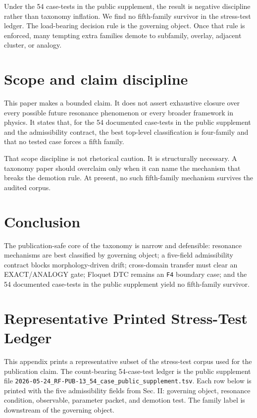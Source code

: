 \documentclass[aps,pra,reprint,nofootinbib]{revtex4-2}
\begin{document}
Under the 54 case-tests in the public supplement, the result is negative discipline rather than taxonomy inflation. We find no fifth-family survivor in the stress-test ledger. The load-bearing decision rule is the governing object. Once that rule is enforced, many tempting extra families demote to subfamily, overlay, adjacent cluster, or analogy.

\section{Scope and claim discipline}

This paper makes a bounded claim. It does not assert exhaustive closure over every possible future resonance phenomenon or every broader framework in physics. It states that, for the 54 documented case-tests in the public supplement and the admissibility contract, the best top-level classification is four-family and that no tested case forces a fifth family.

That scope discipline is not rhetorical caution. It is structurally necessary. A taxonomy paper should overclaim only when it can name the mechanism that breaks the demotion rule. At present, no such fifth-family mechanism survives the audited corpus.

\section{Conclusion}

The publication-safe core of the taxonomy is narrow and defensible: resonance mechanisms are best classified by governing object; a five-field admissibility contract blocks morphology-driven drift; cross-domain transfer must clear an EXACT/ANALOGY gate; Floquet DTC remains an \texttt{F4} boundary case; and the 54 documented case-tests in the public supplement yield no fifth-family survivor.

\appendix

\section{Representative Printed Stress-Test Ledger}
\label{sec:ledger}

This appendix prints a representative subset of the stress-test corpus used for the publication claim. The count-bearing 54-case-test ledger is the public supplement file \texttt{2026-05-24\_RF-PUB-13\_54\_case\_public\_supplement.tsv}. Each row below is printed with the five admissibility fields from Sec. II: governing object, resonance condition, observable, parameter packet, and demotion test. The family label is downstream of the governing object.
\end{document}
